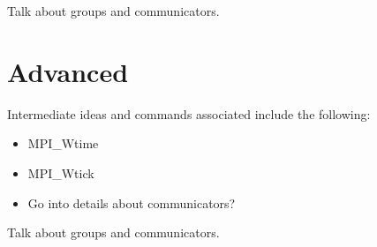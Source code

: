 Talk about groups and communicators.

\section{Advanced}

Intermediate ideas and commands associated include the following: \\
\begin{itemize}
\item MPI_Wtime
\item MPI_Wtick
\item Go into details about communicators?
\end{itemize}

Talk about groups and communicators.

